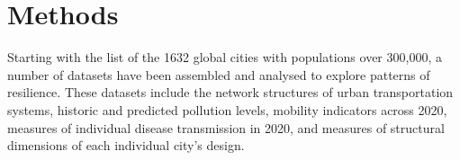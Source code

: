 \documentclass[preprint,12pt]{elsarticle}
\begin{document}





\section*{Methods}

Starting with the list of the 1632 global cities with populations over 300,000\cite{UNDESA2019}, a number of datasets have been assembled and analysed to explore patterns of resilience. These datasets include the network structures of urban transportation systems, historic and predicted pollution levels, mobility indicators across 2020, measures of individual disease transmission in 2020, and measures of structural dimensions of each individual city's design.
\end{document}

